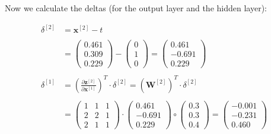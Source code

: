 \documentclass[12pt]{article}
\begin{document}
\begin{enumerate}
\vspace{10pt}
Now we calculate the deltas (for the output layer and the hidden layer):

\begin{equation*}
    \begin{aligned}
        \delta^{[2]} &= \mathbf{x}^{[2]} - t\\
        \\
        &= \begin{pmatrix} 
            0.461 \\
            0.309 \\
            0.229
            \end{pmatrix} -
            \begin{pmatrix} 
            0\\     
            1\\
            0 
            \end{pmatrix} = \begin{pmatrix}
            0.461 \\
            -0.691 \\
            0.229 
            \end{pmatrix}\\
        \\
        \delta^{[1]} &= \left(\frac{\partial \mathbf{z}^{[2]}}{\partial \mathbf{x}^{[1]}}\right)^T \cdot \delta^{[2]} = \left(\mathbf{W}^{[2]}\right)^T \cdot \delta^{[2]}\\
        \\
        &= \begin{pmatrix}
            1 & 1 & 1\\
            2 & 2 & 1\\
            2 & 1 & 1
        \end{pmatrix} \cdot \begin{pmatrix}
            0.461 \\
            -0.691 \\
            0.229 
        \end{pmatrix} \circ \begin{pmatrix}
            0.3\\
            0.3\\
            0.4
        \end{pmatrix} = \begin{pmatrix}
            -0.001\\
            -0.231\\
            0.460
        \end{pmatrix} 
    \end{aligned}
\end{equation*}


\end{enumerate}
\end{document}

